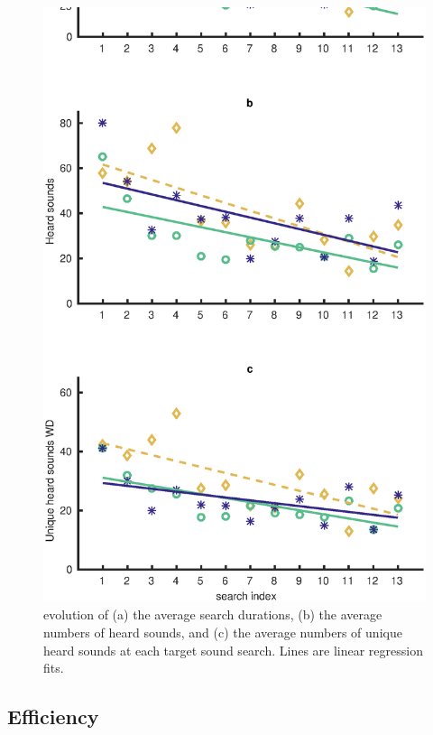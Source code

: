 \documentclass{aes2e}
\begin{document}
\begin{figure}[t]
\begin{center}
\includegraphics[scale=0.4]{gfx/analyse_urban2.eps} 
\end{center}
\caption{\label{fig2urban} evolution of (a) the average search durations, (b) the average numbers of heard sounds, and (c) the average numbers of unique heard sounds at each target sound search. Lines are linear regression fits.}
\end{figure}


\subsection{Efficiency}
\end{document}
